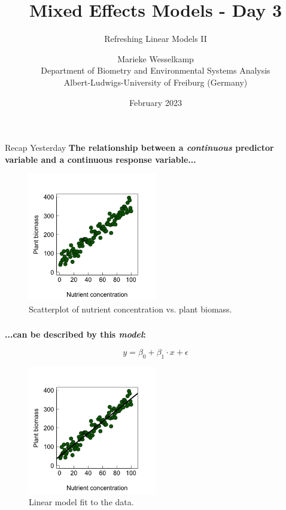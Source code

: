 \documentclass{beamer}
\title{Mixed Effects Models - Day 3}
\subtitle{Refreshing Linear Models II}
\author{Marieke Wesselkamp \\ Department of Biometry and Environmental Systems Analysis \\ Albert-Ludwigs-University of Freiburg (Germany)}
\date{February 2023}
\begin{document}
\begin{frame}
  \titlepage
\end{frame}

\begin{frame}{Recap Yesterday}
  \textbf{The relationship between a \textit{continuous} predictor variable and a continuous response variable...}
  
  \begin{figure}[h]
    \centering
    \includegraphics[width=0.5\textwidth]{lectures/day_3_LM_refresh_II/figures/unnamed-chunk-2-1.png} 
    \caption{Scatterplot of nutrient concentration vs. plant biomass.}
  \end{figure}
\end{frame}

\begin{frame}
  \frametitle{}
  \textbf{...can be described by this \textit{model}:}
  
  \begin{equation*}
  y = \beta_0 + \beta_1 \cdot x + \epsilon
  \end{equation*}
  
  \begin{figure}[h]
    \centering
    \includegraphics[width=0.5\textwidth]{lectures/day_3_LM_refresh_II/figures/unnamed-chunk-3-1.png} 
    \caption{Linear model fit to the data.}
  \end{figure}
\end{frame}
\end{document}

